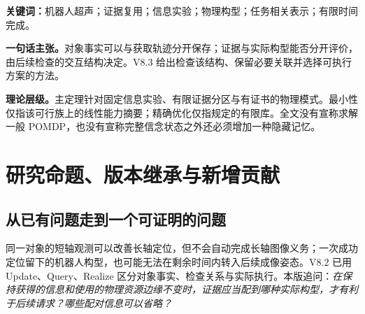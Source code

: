 \documentclass[UTF8,11pt,a4paper,fontset=fandol]{ctexart}
\numberwithin{equation}{section}
\theoremstyle{definition}
\begin{document}
\begin{abstract}
机器人对对象的认识可以按身体坐标保存，但知识的后续用途还取决于获取证据后留下的实际构型与执行资源。V8.2 建立了对象证据、检查请求与完成记录的接口；V7.3 说明，即使当前统计信息与物理模式的边缘分布相同，二者的配对仍可改变后继任务完成率。V8.3 在固定检查范围内，将这一观察发展为一个可计算的受限理论：固定信息实验，在只依据已观察证据选择认证物理模式的模型中，证明所有方案在通常 Blackwell 意义下具有相同对象信息；针对给定后续请求族，给出边缘摘要足够的必要充分条件，以及保留全部期望完成值所需的最小线性关联维数。随后构造具有连续运动、剩余时间与真实图像义务的物理细化证书，并在同一个连续双通道机构中，使物理受限统计缺陷与最优任务完成率差精确相等。方法用有限库上的线性规划选择可实现耦合，以条件证书和能力系数区间给出优化后仍有效的完成下界与最优性间隙。V5.1 提供可替换的联合后验与查询编译后端，V6.1 约束最终动作，V8.2 保留来源、时效和实际图像验收。本文的新增内容是受限操作模型中的结构判据、任务相关表示及其物理联系，不把运输多面体、一般信念状态、Blackwell 比较、线性规划或风险并集界宣称为首次提出。
\end{abstract}
\noindent\textbf{关键词：}机器人超声；证据复用；信息实验；物理构型；任务相关表示；有限时间完成。

\begin{keybox}
\textbf{一句话主张。}对象事实可以与获取轨迹分开保存；证据与实际构型能否分开评价，由后续检查的交互结构决定。V8.3 给出检查该结构、保留必要关联并选择可执行方案的方法。
\medskip\par
\textbf{理论层级。}主定理针对固定信息实验、有限证据分区与有证书的物理模式。最小性仅指该可行族上的线性能力摘要；精确优化仅指规定的有限库。全文没有宣称求解一般 POMDP，也没有宣称完整信念状态之外还必须增加一种隐藏记忆。
\end{keybox}
\tableofcontents
\clearpage

\section{研究命题、版本继承与新增贡献}
\label{sec:position}

\subsection{从已有问题走到一个可证明的问题}
同一对象的短轴观测可以改善长轴定位，但不会自动完成长轴图像义务；一次成功定位留下的机器人构型，也可能无法在剩余时间内转入后续成像姿态。V8.2 已用 Update、Query、Realize 区分对象事实、检查关系与实际执行\cite{v82}。本版追问：\emph{在保持获得的信息和使用的物理资源边缘不变时，证据应当配到哪种实际构型，才有利于后续请求？哪些配对信息可以省略？}
\end{document}
